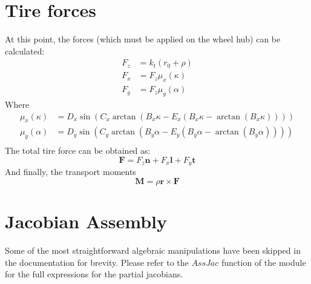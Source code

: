 \section{Tire forces}
At this point, the forces (which must be applied on the wheel hub) can be calculated:
\begin{equation}
    \begin{split}
        F_z &= k_t\left(r_0 + \rho\right)\\
        F_x &= F_z \mu_x(\kappa)\\
        F_y &= F_z \mu_y(\alpha)
    \end{split}
\end{equation}
Where
\begin{equation}
    \begin{split}
        \mu_x(\kappa) &= D_x\sin(C_x\arctan(B_x\kappa-E_x(B_x\kappa-\arctan(B_x\kappa))))\\
        \mu_y(\alpha) &= D_y\sin(C_y\arctan(B_y\alpha-E_y(B_y\alpha-\arctan(B_y\alpha))))\\
    \end{split}
\end{equation}
The total tire force can be obtained as:
\begin{equation}
    \mathbf{F} = F_z \mathbf{n} + F_x \mathbf{l} + F_y \mathbf{t}
\end{equation}
And finally, the transport moments
\begin{equation}
    \mathbf{M} = \rho\mathbf{r} \times \mathbf{F}
\end{equation}

\section{Jacobian Assembly}
Some of the most straightforward algebraic manipulations have been skipped in the documentation for brevity. Please refer to the $\textit{AssJac}$ function of the module for the full expressions for the partial jacobians.

